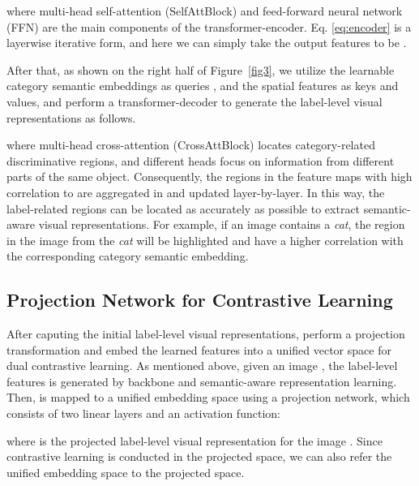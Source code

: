 \documentclass{ecai}
\begin{document}
where multi-head self-attention (SelfAttBlock) and feed-forward neural network (FFN) are the main components of the transformer-encoder. Eq. \ref{eq:encoder} is a layerwise iterative form, and here we can simply take the output features to be .

After that, as shown on the right half of Figure~\ref{fig3}, we utilize the learnable category semantic embeddings as queries , and the spatial features  as keys and values, and perform a transformer-decoder to generate the label-level visual representations as follows. 

where multi-head cross-attention (CrossAttBlock) locates category-related discriminative regions, and different heads focus on information from different parts of the same object. Consequently, the regions in the feature maps with high correlation to  are aggregated in  and updated layer-by-layer. In this way, the label-related regions can be located as accurately as possible to extract semantic-aware visual representations. For example, if an image contains a \textit{cat}, the region in the image from the \textit{cat} will be highlighted and have a higher correlation with the corresponding category semantic embedding.
\subsection{Projection Network for Contrastive Learning}
\label{PNCL}
After caputing the initial label-level visual representations, perform a projection transformation and embed the learned features into a unified vector space for dual contrastive learning. As mentioned above,
given an image , the label-level features  is generated by backbone and semantic-aware representation learning. Then,  is mapped to a unified embedding space using a projection network, which consists of two linear layers and an activation function:

where  is the projected label-level visual representation for the image .
Since contrastive learning is conducted in the projected space, we can also refer the unified embedding space to the projected space.	
\end{document}
